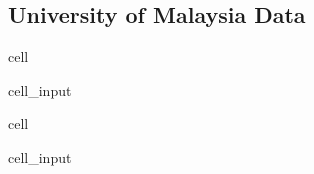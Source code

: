 \documentclass[letterpaper,10pt,english]{jupyterBook}
\begin{document}
\subsection{University of Malaysia Data}
\label{\detokenize{notebooks/replicating_paper:id7}}
\begin{sphinxuseclass}{cell}\begin{sphinxVerbatimInput}

\begin{sphinxuseclass}{cell_input}
\begin{sphinxVerbatim}[commandchars=\\\{\}]
  

  
\end{sphinxVerbatim}

\end{sphinxuseclass}\end{sphinxVerbatimInput}

\end{sphinxuseclass}
\begin{sphinxuseclass}{cell}\begin{sphinxVerbatimInput}

\begin{sphinxuseclass}{cell_input}
\begin{sphinxVerbatim}[commandchars=\\\{\}]
  \PYG{p}{[}\PYG{p}{[} \PYG{p}{]}\PYG{p}{]}
\end{sphinxVerbatim}

\end{sphinxuseclass}\end{sphinxVerbatimInput}

\end{sphinxuseclass}
\end{document}
